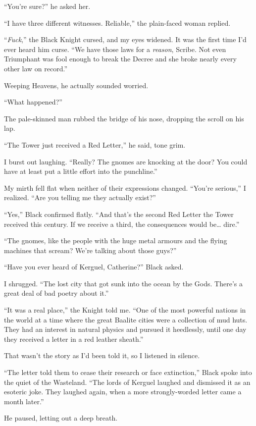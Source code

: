 \documentclass[12pt, openany]{book}
\begin{document}
“You’re sure?” he asked her.

“I have three different witnesses. Reliable,” the plain-faced woman replied.

“\textit{Fuck},” the Black Knight cursed, and my eyes widened. It was the first time I’d ever heard him curse. “We have those laws for a \textit{reason}, Scribe. Not even Triumphant was fool enough to break the Decree and she broke nearly every other law on record.”

Weeping Heavens, he actually sounded worried.

“What happened?”

The pale-skinned man rubbed the bridge of his nose, dropping the scroll on his lap.

“The Tower just received a Red Letter,” he said, tone grim.

I burst out laughing. “Really? The gnomes are knocking at the door? You could have at least put a little effort into the punchline.”

My mirth fell flat when neither of their expressions changed. “You’re serious,” I realized. “Are you telling me they actually exist?”

“Yes,” Black confirmed flatly. “And that’s the second Red Letter the Tower received this century. If we receive a third, the consequences would be… dire.”

“The gnomes, like the people with the huge metal armours and the flying machines that scream? We’re talking about those guys?”

“Have you ever heard of Kerguel, Catherine?” Black asked.

I shrugged. “The lost city that got sunk into the ocean by the Gods. There’s a great deal of bad poetry about it.”

“It was a real place,” the Knight told me. “One of the most powerful nations in the world at a time where the great Baalite cities were a collection of mud huts. They had an interest in natural physics and pursued it heedlessly, until one day they received a letter in a red leather sheath.”

That wasn’t the story as I’d been told it, so I listened in silence.

“The letter told them to cease their research or face extinction,” Black spoke into the quiet of the Wasteland. “The lords of Kerguel laughed and dismissed it as an esoteric joke. They laughed again, when a more strongly-worded letter came a month later.”

He paused, letting out a deep breath.
\end{document}
